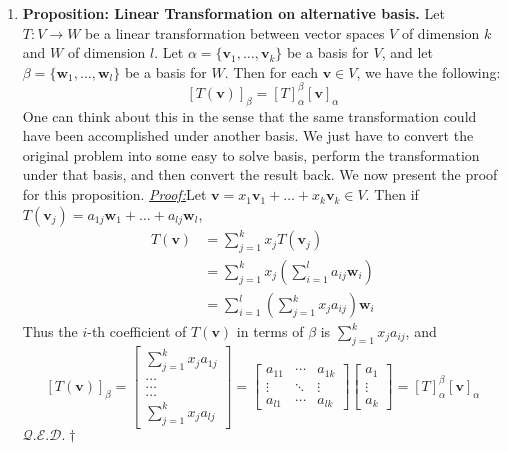 \documentclass[oneside, 12pt]{book}
\newcommand{\settag}[1]{\renewcommand{\theenumi}{#1}}
\newcommand{\qed}{\hfill $\mathcal{Q}.\mathcal{E}.\mathcal{D}.\dagger$}
\newcommand{\tbf}[1]{\textbf{#1}}
\newcommand{\tit}[1]{\textit{#1}}
\newcommand{\proof}{\tit{\underline{Proof:}}} %
\newcommand{\vv}{\mathbf{v}}
\begin{document}
\begin{enumerate}
        \settag{2.2.15}
        \item \tbf{Proposition: Linear Transformation on alternative basis.} Let $T:V\xrightarrow{} W$ 
        be a linear transformation between vector spaces $V$ of dimension $k$ and $W$ of dimension $l$. 
        Let $\alpha = \{\mathbf{v}_1,\ldots,\mathbf{v}_k\}$ be a basis for $V$, and let $\beta = \{\mathbf{w}_1,\ldots,\mathbf{w}_l\}$ be a basis for $W$. 
        Then for each $\mathbf{v} \in V$, we have the following:
        \begin{equation*}
            \left[T(\mathbf{v})\right]_\beta = \left[T\right]^\beta_\alpha\left[\mathbf{v}\right]_\alpha
        \end{equation*}
        One can think about this in the sense that the same transformation could have been accomplished under another basis.
         We just have to convert the original problem into some easy to solve basis, perform the transformation under that basis, 
         and then convert the result back. We now present the proof for this proposition.\newline
        \proof Let $\mathbf{v}=x_1\mathbf{v}_1 + \ldots + x_k\mathbf{v}_k\in V$. Then if $T(\mathbf{v}_j)=a_{1j}\mathbf{w}_1 + \ldots + a_{lj}\mathbf{w}_l$, 
        \begin{align*}
            T(\mathbf{v}) &= \sum_{j=1}^k x_j T(\mathbf{v}_j) \\
            &= \sum_{j=1}^k x_j \left(\sum_{i=1}^{l}a_{ij}\mathbf{w}_i\right) \\
            &= \sum_{i=1}^l\left(\sum_{j=1}^k x_j a_{ij} \right)\mathbf{w}_i
        \end{align*}
        Thus the $i$-th coefficient of $T(\mathbf{v})$ in terms of $\beta$ is $\sum_{j=1}^k x_j a_{ij}$, and
        \begin{equation*}
            \left[T(\mathbf{v})\right]_\beta = 
            \begin{bmatrix}\sum_{j=1}^kx_ja_{1j} 
            \\ \dots 
            \\ \dots 
            \\ \dots 
            \\ \sum_{j=1}^kx_ja_{lj}
            \end{bmatrix}
            =
            \begin{bmatrix}
            a_{11} & \cdots & a_{1k} \\
            \vdots & \ddots & \vdots \\
            a_{l1} & \cdots & a_{lk}
            \end{bmatrix}
            \begin{bmatrix}
            a_1 \\ \vdots \\ a_k
            \end{bmatrix}
            =\left[T\right]_\alpha^\beta\left[\vv\right]_\alpha
        \end{equation*}
        \qed
        

\end{enumerate}
\end{document}
